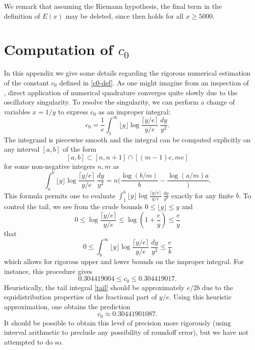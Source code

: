 \documentclass[12pt,a4paper,reqno]{amsart}
\numberwithin{equation}{section}
\theoremstyle{plain}
\theoremstyle{definition}
\begin{document}
We remark that assuming the Riemann hypothesis, the final term in the definition of $E(x)$ may be deleted, since \cite[(7.3)]{buthe} then holds for all $x \geq 5000$.

\section{Computation of \texorpdfstring{$c_0$}{c\_0}}\label{c0-app}

In this appendix we give some details regarding the rigorous numerical estimation of the constant $c_0$ defined in \eqref{c0-def}.  As one might imagine from an inspection of , direct application of numerical quadrature converges quite slowly due to the oscillatory singularity.  To resolve the singularity, we can perform a change of variables $x=1/y$ to express $c_0$ as an improper integral:
\begin{equation}\label{c0-alt}
   c_0 = \frac{1}{e} \int_1^\infty \lfloor y \rfloor \log \frac{\lceil y/e \rceil}{y/e}\ \frac{dy}{y^2}.
\end{equation}
The integrand is piecewise smooth and the integral can be computed explicitly on any interval $[a,b]$ of the form
$$ [a,b] \subset [n, n+1] \cap [(m-1)e, me]$$
for some non-negative integers $n,m$ as
$$ \int_a^b \lfloor y \rfloor \log \frac{\lceil y/e \rceil}{y/e}\ \frac{dy}{y^2} = n (\frac{\log(b/m)}{b} - \frac{\log(a/m){a}}).$$
This formula permits one to evaluate $\int_1^b \lfloor y \rfloor \log \frac{\lceil y/e \rceil}{y/e}\ \frac{dy}{y^2}$ exactly for any finite $b$.  To control the tail, we see from the crude bounds $0 \leq \lfloor y \rfloor \leq y$ and
$$ 0 \leq \log \frac{\lceil y/e \rceil}{y/e} \leq \log 
\left(1 + \frac{e}{y}\right) \leq \frac{e}{y}
$$
that
\begin{equation}\label{tail}
   0 \leq \int_b^\infty \lfloor y \rfloor \log \frac{\lceil y/e \rceil}{y/e}\ \frac{dy}{y^2} \leq \frac{e}{b}
\end{equation}
which allows for rigorous upper and lower bounds on the improper integral.  For instance, this procedure gives
$$ 0.304419004 \leq c_0 \leq 0.304419017.$$
Heuristically, the tail integral \eqref{tail} should be approximately $e/2b$ due to the equidistribution properties of the fractional part of $y/e$.  Using this heuristic approximation, one obtains the prediction
$$ c_0 \approx 0.30441901087.$$
It should be possible to obtain this level of precision more rigorously (using interval arithmetic to preclude any possibility of roundoff error), but we have not attempted to do so.
\end{document}
